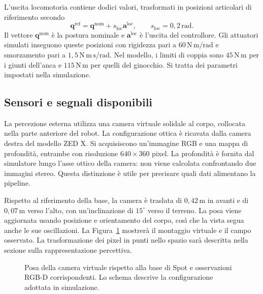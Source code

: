 L'uscita locomotoria contiene dodici valori, trasformati in posizioni articolari di riferimento secondo
\begin{equation}
    \mathbf q^{\mathrm{ref}}=\mathbf q^{\mathrm{nom}}
                  +s_{\mathrm{loc}}\mathbf a^{\mathrm{loc}},
    \qquad s_{\mathrm{loc}}=0{,}2\,\mathrm{rad}.
    \label{eq:metodo-riferimenti-locomotori}
\end{equation}
Il vettore $\mathbf q^{\mathrm{nom}}$ è la postura nominale e $\mathbf a^{\mathrm{loc}}$ è l'uscita del controllore. Gli attuatori simulati inseguono queste posizioni con rigidezza pari a $60\,\mathrm{N\,m/rad}$ e smorzamento pari a $1{,}5\,\mathrm{N\,m\,s/rad}$. Nel modello, i limiti di coppia sono $45\,\mathrm{N\,m}$ per i giunti dell'anca e $115\,\mathrm{N\,m}$ per quelli del ginocchio. Si tratta dei parametri impostati nella simulazione.

\subsection{Sensori e segnali disponibili}

La percezione esterna utilizza una camera virtuale solidale al corpo, collocata nella parte anteriore del robot. La configurazione ottica è ricavata dalla camera destra del modello ZED X. Si acquisiscono un'immagine RGB e una mappa di profondità, entrambe con risoluzione $640\times360$ pixel. La profondità è fornita dal simulatore lungo l'asse ottico della camera: non viene calcolata confrontando due immagini stereo. Questa distinzione è utile per precisare quali dati alimentano la pipeline.

Rispetto al riferimento della base, la camera è traslata di $0{,}42\,\mathrm{m}$ in avanti e di $0{,}07\,\mathrm{m}$ verso l'alto, con un'inclinazione di $15^\circ$ verso il terreno. La posa viene aggiornata usando posizione e orientamento del corpo, così che la vista segua anche le sue oscillazioni. La Figura~\ref{fig:metodo-spot-camera} mostrerà il montaggio virtuale e il campo osservato. La trasformazione dei pixel in punti nello spazio sarà descritta nella sezione sulla rappresentazione percettiva.

\begin{figure}[tbp]
    \centering
    \caption[Configurazione della camera sul robot simulato]{Posa della camera virtuale rispetto alla base di Spot e osservazioni RGB-D corrispondenti. Lo schema descrive la configurazione adottata in simulazione.}
    \label{fig:metodo-spot-camera}
\end{figure}

